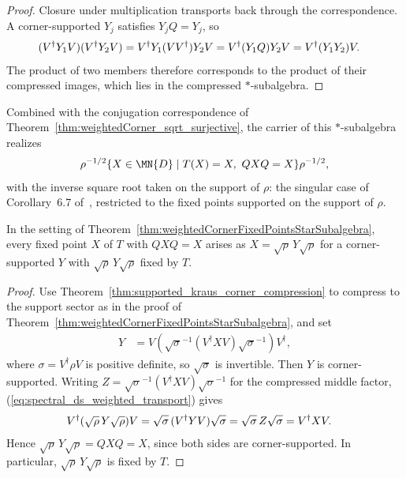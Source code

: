 \begin{proof}
    Closure under multiplication transports back through the correspondence.
    A corner-supported $Y_j$ satisfies $Y_jQ=Y_j$, so
    \begin{align}
        (V^\dagger Y_1V)(V^\dagger Y_2V)
         & =V^\dagger Y_1(VV^\dagger)Y_2V
        =V^\dagger(Y_1Q)Y_2V
        =V^\dagger(Y_1Y_2)V.
        \notag
    \end{align}
    The product of two members therefore corresponds to the product of
    their compressed images, which lies in the compressed
    $*$-subalgebra.
\end{proof}

Combined with the conjugation correspondence of
Theorem~\ref{thm:weightedCorner_sqrt_surjective}, the carrier of this
$*$-subalgebra realizes
\begin{align}
    \rho^{-1/2}
    \{X\in\MN{D}\mid T(X)=X,\ QXQ=X\}
    \rho^{-1/2},
    \notag
\end{align}
with the inverse square root taken on the support of $\rho$: the singular
case of Corollary~6.7 of~\cite{Wolf2012Quantum}, restricted to the fixed
points supported on the support of $\rho$.

\begin{theorem}%
    \label{thm:weightedCorner_sqrt_surjective}
    \leanok
    In the setting of
    Theorem~\ref{thm:weightedCornerFixedPointsStarSubalgebra}, every fixed
    point $X$ of $T$ with $QXQ=X$ arises as
    $X=\sqrt{\rho}\,Y\sqrt{\rho}$ for a corner-supported $Y$ with
    $\sqrt{\rho}\,Y\sqrt{\rho}$ fixed by $T$.
\end{theorem}

\begin{proof}
    \leanok
    Use Theorem~\ref{thm:supported_kraus_corner_compression} to compress to
    the support sector as in the proof of
    Theorem~\ref{thm:weightedCornerFixedPointsStarSubalgebra}, and set
    \begin{align}
        Y
         & =V\left(\sqrt{\sigma}^{-1}(V^\dagger XV)
        \sqrt{\sigma}^{-1}\right)V^\dagger,
        \label{eq:spectral_ds_weighted_preimage}
    \end{align}
    where $\sigma=V^\dagger\rho V$ is positive definite, so
    $\sqrt{\sigma}$ is invertible. Then $Y$ is corner-supported. Writing
    $Z=\sqrt{\sigma}^{-1}(V^\dagger XV)\sqrt{\sigma}^{-1}$ for the
    compressed middle factor, (\ref{eq:spectral_ds_weighted_transport})
    gives
    \begin{align}
        V^\dagger(\sqrt{\rho}\,Y\sqrt{\rho})V
         & =\sqrt{\sigma}\,(V^\dagger YV)\sqrt{\sigma}
        =\sqrt{\sigma}\,Z\sqrt{\sigma}
        =V^\dagger XV.
        \notag
    \end{align}
    Hence $\sqrt{\rho}\,Y\sqrt{\rho}=QXQ=X$, since both sides are
    corner-supported. In particular, $\sqrt{\rho}\,Y\sqrt{\rho}$ is fixed
    by $T$.
\end{proof}


